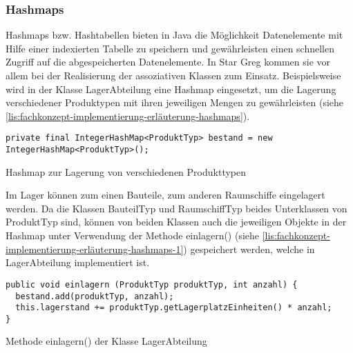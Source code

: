 \subsubsection{Hashmaps}
\label{subsub:fachkonzept-implementierung-erläuterung-hashmaps}

Hashmaps bzw. Hashtabellen bieten in Java die Möglichkeit Datenelemente mit Hilfe einer indexierten Tabelle zu speichern und gewährleisten einen schnellen Zugriff auf die abgespeicherten Datenelemente. In Star Greg kommen sie vor allem bei der Realisierung der assoziativen Klassen zum Einsatz. Beispielsweise wird in der Klasse LagerAbteilung eine Hashmap eingesetzt, um die Lagerung verschiedener Produktypen mit ihren jeweiligen Mengen zu gewährleisten (siehe \ref{lis:fachkonzept-implementierung-erläuterung-hashmaps}).

\begin{programm}[htb]
\begin{lstlisting}[breaklines=true]
private final IntegerHashMap<ProduktTyp> bestand = new IntegerHashMap<ProduktTyp>();
\end{lstlisting}
\caption{Hashmap zur Lagerung von verschiedenen Produkttypen\label{lis:fachkonzept-implementierung-erläuterung-hashmaps}}
\end{programm}

Im Lager können zum einen Bauteile, zum anderen Raumschiffe eingelagert werden. Da die Klassen BauteilTyp und RaumschiffTyp beides Unterklassen von ProduktTyp sind, können von beiden Klassen auch die jeweiligen Objekte in der Hashmap unter Verwendung der Methode einlagern() (siehe \ref{lis:fachkonzept-implementierung-erläuterung-hashmaps-1}) gespeichert werden, welche in LagerAbteilung implementiert ist.

\begin{programm}[htb]
\begin{lstlisting}[breaklines=true]
public void einlagern (ProduktTyp produktTyp, int anzahl) {
  bestand.add(produktTyp, anzahl);
  this.lagerstand += produktTyp.getLagerplatzEinheiten() * anzahl;
}
\end{lstlisting}
\caption{Methode einlagern() der Klasse LagerAbteilung\label{lis:fachkonzept-implementierung-erläuterung-hashmaps-1}}
\end{programm}